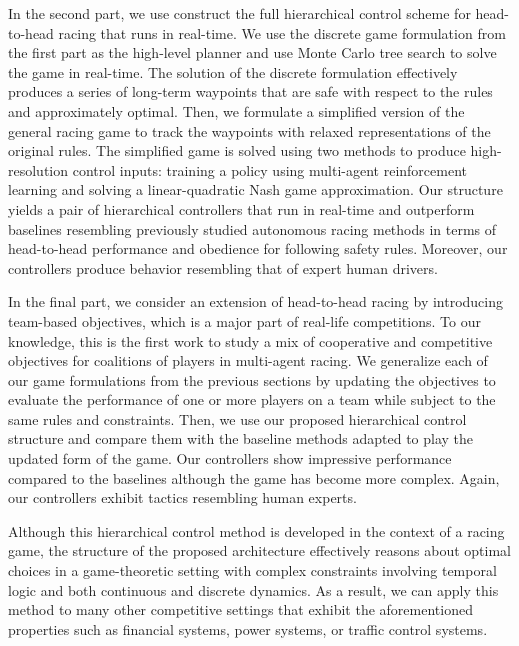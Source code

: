 In the second part, we use construct the full hierarchical control scheme for head-to-head racing that runs in real-time. We use the discrete game formulation from the first part as the high-level planner and use Monte Carlo tree search to solve the game in real-time. The solution of the discrete formulation effectively produces a series of long-term waypoints that are safe with respect to the rules and approximately optimal. Then, we formulate a simplified version of the general racing game to track the waypoints with relaxed representations of the original rules. The simplified game is solved using two methods to produce high-resolution control inputs: training a policy using multi-agent reinforcement learning and solving a linear-quadratic Nash game approximation. Our structure yields a pair of hierarchical controllers that run in real-time and outperform baselines resembling previously studied autonomous racing methods in terms of head-to-head performance and obedience for following safety rules. Moreover, our controllers produce behavior resembling that of expert human drivers. 

In the final part, we consider an extension of head-to-head racing by introducing team-based objectives, which is a major part of real-life competitions. To our knowledge, this is the first work to study a mix of cooperative and competitive objectives for coalitions of players in multi-agent racing. We generalize each of our game formulations from the previous sections by updating the objectives to evaluate the performance of one or more players on a team while subject to the same rules and constraints. Then, we use our proposed hierarchical control structure and compare them with the baseline methods adapted to play the updated form of the game. Our controllers show impressive performance compared to the baselines although the game has become more complex. Again, our controllers exhibit tactics resembling human experts.

Although this hierarchical control method is developed in the context of a racing game, the structure of the proposed architecture effectively reasons about optimal choices in a game-theoretic setting with complex constraints involving temporal logic and both continuous and discrete dynamics. As a result, we can apply this method to many other competitive settings that exhibit the aforementioned properties such as financial systems, power systems, or traffic control systems.

